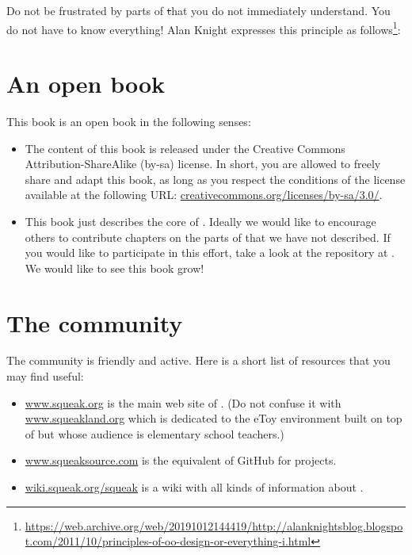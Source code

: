 \documentclass[a4paper,10pt,twoside]{book}
\begin{document}
Do not be frustrated by parts of \st that you do not immediately understand.
You do not have to know everything!
Alan Knight expresses this principle as follows\footnote{\url{https://web.archive.org/web/20191012144419/http://alanknightsblog.blogspot.com/2011/10/principles-of-oo-design-or-everything-i.html}}:

\section*{An open book}

This book is an open book in the following senses: 

\begin{itemize}

\item	The content of this book is released under the Creative Commons Attribution-ShareAlike (by-sa) license.
		In short, you are allowed to freely share and adapt this book, as long as you respect the conditions of the license available at the following URL: 
		\url{creativecommons.org/licenses/by-sa/3.0/}.

\item	This book just describes the core of \sq.
		Ideally we would like to encourage others to contribute chapters
		on the parts of \sq that we have not described.
		If you would like to participate in this effort, take a look at the repository at \sbeRepoUrl.
		We would like to see this book grow!
\end{itemize}

\section*{The \sq community}

The \sq community is friendly and active.
Here is a short list of resources that you may find useful:

\begin{itemize}
\item \url{www.squeak.org} is the main web site of \sq. (Do not confuse it with \url{www.squeakland.org} which is dedicated to the eToy environment built on top of \sq but whose audience is elementary school teachers.)

\item \url{www.squeaksource.com} is the equivalent of GitHub for \sq projects.

\item \url{wiki.squeak.org/squeak} is a wiki with all kinds of information about \sq.
\end{itemize}
\end{document}
